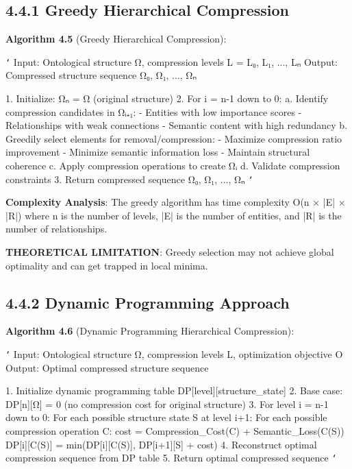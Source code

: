 \subsection{4.4.1 Greedy Hierarchical Compression}

\textbf{Algorithm 4.5} (Greedy Hierarchical Compression):

\texttt{`}
Input: Ontological structure Ω, compression levels L = {L₀, L₁, ..., Lₙ}
Output: Compressed structure sequence {Ω₀, Ω₁, ..., Ωₙ}

1. Initialize: Ωₙ = Ω (original structure)
2. For i = n-1 down to 0:
   a. Identify compression candidates in Ωᵢ₊₁:
      - Entities with low importance scores
      - Relationships with weak connections
      - Semantic content with high redundancy
   b. Greedily select elements for removal/compression:
      - Maximize compression ratio improvement
      - Minimize semantic information loss
      - Maintain structural coherence
   c. Apply compression operations to create Ωᵢ
   d. Validate compression constraints
3. Return compressed sequence {Ω₀, Ω₁, ..., Ωₙ}
\texttt{`}

\textbf{Complexity Analysis}: The greedy algorithm has time complexity O(n × |E| × |R|) where n is the number of levels, |E| is the number of entities, and |R| is the number of relationships.

\textbf{THEORETICAL LIMITATION}: Greedy selection may not achieve global optimality and can get trapped in local minima.

\subsection{4.4.2 Dynamic Programming Approach}

\textbf{Algorithm 4.6} (Dynamic Programming Hierarchical Compression):

\texttt{`}
Input: Ontological structure Ω, compression levels L, optimization objective O
Output: Optimal compressed structure sequence

1. Initialize dynamic programming table DP[level][structure_state]
2. Base case: DP[n][Ω] = 0 (no compression cost for original structure)
3. For level i = n-1 down to 0:
   For each possible structure state S at level i+1:
     For each possible compression operation C:
       cost = Compression_Cost(C) + Semantic_Loss(C(S))
       DP[i][C(S)] = min(DP[i][C(S)], DP[i+1][S] + cost)
4. Reconstruct optimal compression sequence from DP table
5. Return optimal compressed sequence
\texttt{`}

